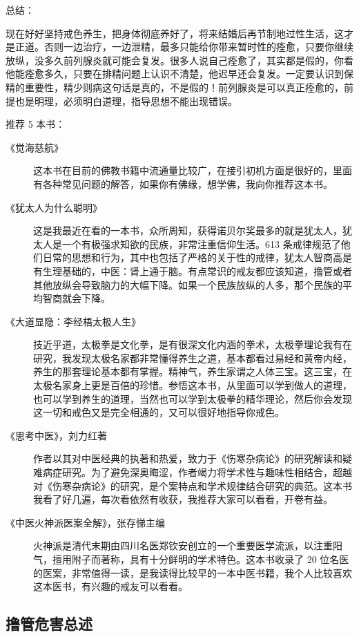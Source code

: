 \documentclass{ctexart}
\begin{document}
总结：

现在好好坚持戒色养生，把身体彻底养好了，将来结婚后再节制地过性生活，这才是正道。否则一边治疗，一边泄精，最多只能给你带来暂时性的痊愈，只要你继续放纵，没多久前列腺炎就可能会复发。很多人说自己痊愈了，其实都是假的，你看他能痊愈多久，只要在排精问题上认识不清楚，他迟早还会复发。一定要认识到保精的重要性，精少则病这句话是真的，不是假的！前列腺炎是可以真正痊愈的，前提也是明理，必须明白道理，指导思想不能出现错误。

推荐 5 本书：

\begin{description}
    \item[《觉海慈航》] 这本书在目前的佛教书籍中流通量比较广，在接引初机方面是很好的，里面有各种常见问题的解答，如果你有佛缘，想学佛，我向你推荐这本书。
    \item[《犹太人为什么聪明》] 这是我最近在看的一本书，众所周知，获得诺贝尔奖最多的就是犹太人，犹太人是一个有极强求知欲的民族，非常注重信仰生活。613 条戒律规范了他们日常的思想和行为，其中也包括了严格的关于性的戒律，犹太人智商高是有生理基础的，中医：肾上通于脑。有点常识的戒友都应该知道，撸管或者其他放纵会导致脑力的大幅下降。如果一个民族放纵的人多，那个民族的平均智商就会下降。
    \item[《大道显隐：李经梧太极人生》] 技近乎道，太极拳是文化拳，是有很深文化内涵的拳术，太极拳理论我有在研究，我发现太极名家都非常懂得养生之道，基本都看过易经和黄帝内经，养生的那套理论基本都有掌握。精神气，养生家谓之人体三宝。这三宝，在太极名家身上更是百倍的珍惜。参悟这本书，从里面可以学到做人的道理，也可以学到养生的道理，当然也可以学到太极拳的精华理论，然后你会发现这一切和戒色又是完全相通的，又可以很好地指导你戒色。
    \item[《思考中医》，刘力红著] 作者以其对中医经典的执著和热爱，致力于《伤寒杂病论》的研究解读和疑难病症研究。为了避免深奥晦涩，作者竭力将学术性与趣味性相结合，超越对《伤寒杂病论》的研究，是个案特点和学术规律结合研究的典范。这本书我看了好几遍，每次看依然有收获，我推荐大家可以看看，开卷有益。
    \item[《中医火神派医案全解》，张存悌主编] 火神派是清代末期由四川名医郑钦安创立的一个重要医学流派，以注重阳气，擅用附子而著称，具有十分鲜明的学术特色。这本书收录了 20 位名医的医案，非常值得一读，是我读得比较早的一本中医书籍，我个人比较喜欢这本医书，有兴趣的戒友可以看看。
\end{description}

\subsection{撸管危害总述}
\end{document}
